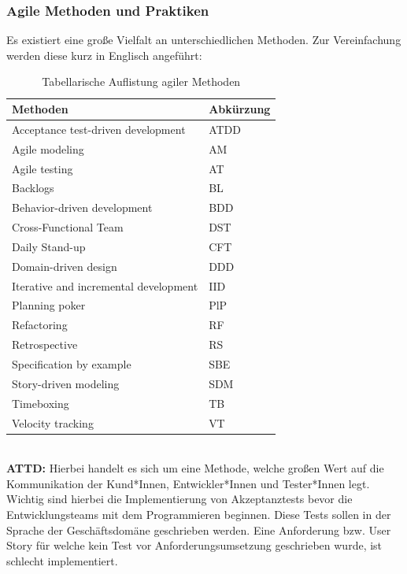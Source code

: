 \subsubsection{Agile Methoden und Praktiken}
Es existiert eine große Vielfalt an unterschiedlichen Methoden. Zur Vereinfachung werden diese kurz in Englisch angeführt:
\begin{table}[h!]
    \centering
    \caption{Tabellarische Auflistung agiler Methoden}
    \label{tab:agile-methods}
    \begin{tabular}{|l|l|}
    \hline
    \textbf{Methoden} & \textbf{Abkürzung} \\ \hline
    Acceptance test-driven development  & ATDD                 \\ \hline
    Agile modeling    & AM                \\ \hline
    Agile testing             & AT          \\ \hline
    Backlogs & BL                \\ \hline
    Behavior-driven development & BDD                 \\ \hline
    Cross-Functional Team     & DST                \\ \hline
    Daily Stand-up    & CFT                \\ \hline
    Domain-driven design   & DDD               \\ \hline
    Iterative and incremental development    & IID               \\ \hline
    Planning poker  & PlP               \\ \hline
    Refactoring  & RF               \\ \hline
    Retrospective  & RS               \\ \hline
    Specification by example  & SBE               \\ \hline
    Story-driven modeling  & SDM               \\ \hline
    Timeboxing   & TB               \\ \hline
    Velocity tracking   & VT               \\ \hline
    \end{tabular}
\end{table} \\

\textbf{ATTD:} Hierbei handelt es sich um eine Methode, welche großen Wert auf die Kommunikation der Kund*Innen, Entwickler*Innen und Tester*Innen legt. 
Wichtig sind hierbei die Implementierung von Akzeptanztests bevor die Entwicklungsteams mit dem Programmieren beginnen.
Diese Tests sollen in der Sprache der Geschäftsdomäne geschrieben werden. Eine Anforderung bzw.
User Story für welche kein Test vor Anforderungsumsetzung geschrieben wurde, ist schlecht implementiert.\cite{Downs2011-uk}\\


